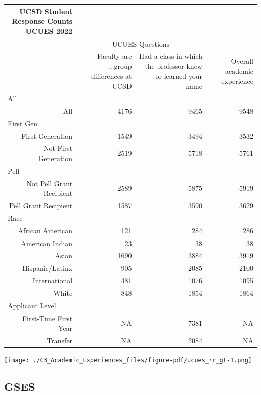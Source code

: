 \documentclass[
  letterpaper,
  DIV=11,
  numbers=noendperiod]{scrreprt}
\begin{document}
\captionsetup[table]{labelformat=empty,skip=1pt}
\begin{longtable}{r|rrr}
\caption*{
{\large UCSD Student Response Counts} \\ 
{\small UCUES 2022}
} \\ 
\toprule
\multicolumn{1}{l}{} & \multicolumn{2}{c}{UCUES Questions} &  \\ 
\cmidrule(lr){2-3}
\multicolumn{1}{l}{} & Faculty are ...group differences at UCSD & Had a class in which the professor knew or learned your name & Overall academic experience \\ 
\midrule
\multicolumn{1}{l}{All} \\ 
\midrule
All & 4176 & 9465 & 9548 \\ 
\midrule
\multicolumn{1}{l}{First Gen} \\ 
\midrule
First Generation & 1549 & 3494 & 3532 \\ 
Not First Generation & 2519 & 5718 & 5761 \\ 
\midrule
\multicolumn{1}{l}{Pell} \\ 
\midrule
Not Pell Grant Recipient & 2589 & 5875 & 5919 \\ 
Pell Grant Recipient & 1587 & 3590 & 3629 \\ 
\midrule
\multicolumn{1}{l}{Race} \\ 
\midrule
African American & 121 & 284 & 286 \\ 
American Indian & 23 & 38 & 38 \\ 
Asian & 1690 & 3884 & 3919 \\ 
Hispanic/Latinx & 905 & 2085 & 2100 \\ 
International & 481 & 1076 & 1095 \\ 
White & 848 & 1854 & 1864 \\ 
\midrule
\multicolumn{1}{l}{Applicant Level} \\ 
\midrule
First-Time First Year & NA & 7381 & NA \\ 
Transfer & NA & 2084 & NA \\ 
\bottomrule
\end{longtable}

\texttt{[image: ./C3\_Academic\_Experiences\_files/figure-pdf/ucues\_rr\_gt-1.png]}

\hypertarget{gses}{%
\subsection{GSES}\label{gses}}
\end{document}
